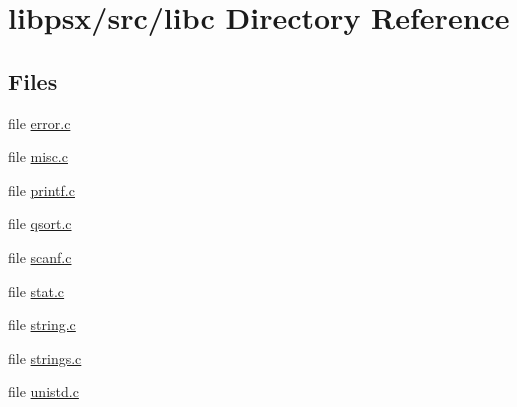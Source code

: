 \hypertarget{dir_000012}{}\section{libpsx/src/libc Directory Reference}
\label{dir_000012}
\subsection*{Files}
\begin{DoxyCompactItemize}
\item 
file \hyperlink{error_8c}{error.\+c}
\item 
file \hyperlink{misc_8c}{misc.\+c}
\item 
file \hyperlink{printf_8c}{printf.\+c}
\item 
file \hyperlink{qsort_8c}{qsort.\+c}
\item 
file \hyperlink{scanf_8c}{scanf.\+c}
\item 
file \hyperlink{stat_8c}{stat.\+c}
\item 
file \hyperlink{string_8c}{string.\+c}
\item 
file \hyperlink{strings_8c}{strings.\+c}
\item 
file \hyperlink{unistd_8c}{unistd.\+c}
\end{DoxyCompactItemize}
